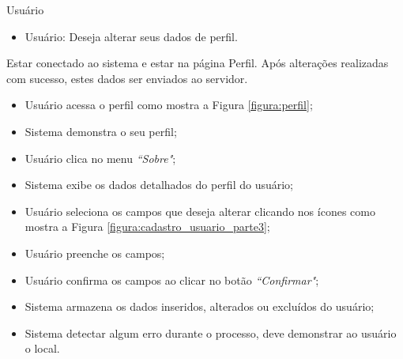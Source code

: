 {Usuário}
{
\begin{itemize}
	\item Usuário: Deseja alterar seus dados de perfil.	
\end{itemize}
}
{Estar conectado ao sistema e estar na página Perfil.}
{Após alterações realizadas com sucesso, estes dados ser enviados ao servidor.}
{
\begin{itemize}
	\item Usuário acessa o perfil como mostra a Figura \ref{figura:perfil};
	\item Sistema demonstra o seu perfil;
	\item Usuário clica no menu \textit{``Sobre"};
 	\item Sistema exibe os dados detalhados do perfil do usuário;
	\item Usuário seleciona os campos que deseja alterar clicando nos ícones como mostra a Figura \ref{figura:cadastro_usuario_parte3};
	\item Usuário preenche os campos;
	\item Usuário confirma os campos ao clicar no botão \textit{``Confirmar"};
	\item Sistema armazena os dados inseridos, alterados ou excluídos do usuário;
	\item Sistema detectar algum erro durante o processo, deve demonstrar ao usuário o local.
\end{itemize}
}
